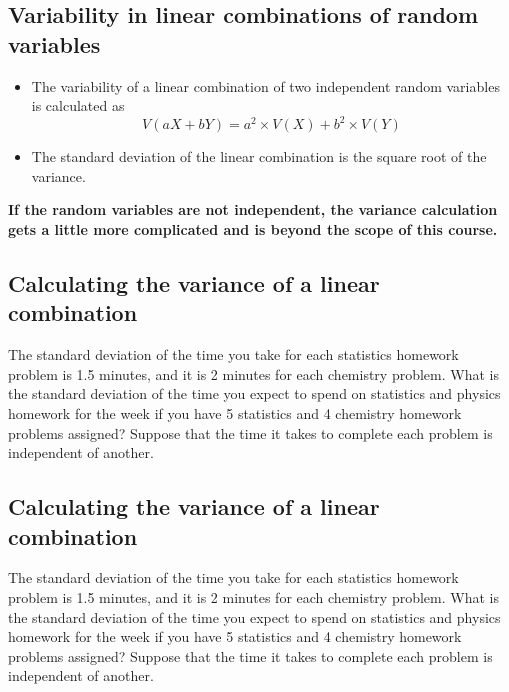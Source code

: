 \documentclass[
]{article}
\providecommand{\tightlist}{%
  \setlength{\itemsep}{0pt}\setlength{\parskip}{0pt}}
\begin{document}
\hypertarget{variability-in-linear-combinations-of-random-variables}{%
\subsection{Variability in linear combinations of random
variables}\label{variability-in-linear-combinations-of-random-variables}}

\begin{itemize}
\tightlist
\item
  The variability of a linear combination of two independent random
  variables is calculated as \[
  V(aX + bY) = a^2 \times V(X) + b^2 \times V(Y)
  \]
\item
  The standard deviation of the linear combination is the square root of
  the variance.
\end{itemize}

\textbf{If the random variables are not independent, the variance
calculation gets a little more complicated and is beyond the scope of
this course.}

\hypertarget{calculating-the-variance-of-a-linear-combination}{%
\subsection{Calculating the variance of a linear
combination}\label{calculating-the-variance-of-a-linear-combination}}

The standard deviation of the time you take for each statistics homework
problem is 1.5 minutes, and it is 2 minutes for each chemistry problem.
What is the standard deviation of the time you expect to spend on
statistics and physics homework for the week if you have 5 statistics
and 4 chemistry homework problems assigned? Suppose that the time it
takes to complete each problem is independent of another.

\hypertarget{calculating-the-variance-of-a-linear-combination-1}{%
\subsection{Calculating the variance of a linear
combination}\label{calculating-the-variance-of-a-linear-combination-1}}

The standard deviation of the time you take for each statistics homework
problem is 1.5 minutes, and it is 2 minutes for each chemistry problem.
What is the standard deviation of the time you expect to spend on
statistics and physics homework for the week if you have 5 statistics
and 4 chemistry homework problems assigned? Suppose that the time it
takes to complete each problem is independent of another.
\end{document}
